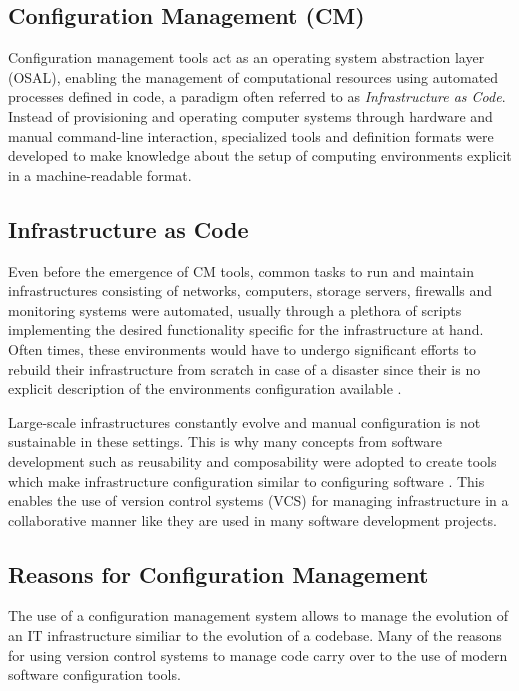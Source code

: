\subsection{Configuration Management (CM)}

Configuration management tools act as an operating system abstraction layer (OSAL), enabling the management of computational resources using automated processes defined in code, a paradigm often referred to as \textit{Infrastructure as Code}. Instead of provisioning and operating computer systems through hardware and manual command-line interaction, specialized tools and definition formats were developed to make knowledge about the setup of computing environments explicit in a machine-readable format.

\subsection{Infrastructure as Code}

Even before the emergence of CM tools, common tasks to run and maintain infrastructures consisting of networks, computers, storage servers, firewalls and monitoring systems were automated, usually through a plethora of scripts implementing the desired functionality specific for the infrastructure at hand. Often times, these environments would have to undergo significant efforts to rebuild their infrastructure from scratch in case of a disaster since their is no explicit description of the environments configuration available \cite{Hüttermann2012}.

Large-scale infrastructures constantly evolve and manual configuration is not sustainable in these settings. This is why many concepts from software development such as reusability and composability were adopted to create tools which make infrastructure configuration similar to configuring software \cite{kanies2006puppet}. This enables the use of version control systems (VCS) for managing infrastructure in a collaborative manner like they are used in many software development projects.

\subsection{Reasons for Configuration Management}

The use of a configuration management system allows to manage the evolution of an IT infrastructure similiar to the evolution of a codebase. Many of the reasons for using version control systems to manage code \cite{Dart:1991:CCM:111062.111063}\cite{1983ansi} carry over to the use of modern software configuration tools.

